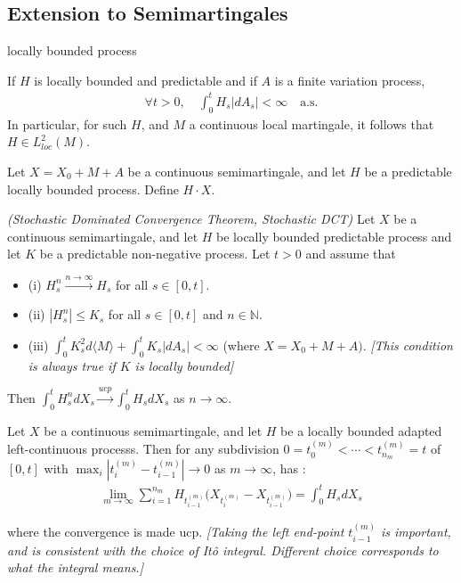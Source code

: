\documentclass[10pt,a4paper]{article}
\renewenvironment{i}
{\begin{itemize} 
	}%
	{\end{itemize}
}
\begin{document}
\subsection{Extension to Semimartingales}

 locally bounded process
\s

\fact If $H$ is locally bounded and predictable and if $A$ is a finite variation process,
\begin{align*}
\forall t>0, \quad \int_0^t H_s |dA_s| < \infty \quad \text{a.s.}
\end{align*}
In particular, for such $H$, and $M$ a continuous local martingale, it follows that $H\in L_{loc}^2(M)$.
\s

 Let $X = X_0 + M + A$ be a continuous semimartingale, and let $H$ be a predictable locally bounded process. Define $H\cdot X$.
\s

\prop \emph{(Stochastic Dominated Convergence Theorem, Stochastic DCT)} Let $X$ be a continuous semimartingale, and let $H$ be locally bounded predictable process and let $K$ be a predictable non-negative process. Let $t>0$ and assume that
\begin{i}
\item[(i)] $H_s^n \xrightarrow{n\rightarrow \infty} H_s$ for all $s\in [0,t]$.
\item[(ii)] $|H_s^n|\leq K_s$ for all $s\in [0, t]$ and $n\in \mathbb{N}$.
\item[(iii)] $\int_0^t K_s^2 d\langle M \rangle + \int_0^t K_s |dA_s| < \infty$ (where $X = X_0 + M +A)$. \emph{[This condition is always true if $K$ is locally bounded]}
\end{i}
Then $\int_0^t H_s^n dX_s \xrightarrow{ucp}\int_0^t H_s dX_s$ as $n\rightarrow \infty$.
\s

\corr Let $X$ be a continuous semimartingale, and let $H$ be a locally bounded adapted left-continuous processs. Then for any subdivision $0 =t_0^{(m)} < \cdots < t_{n_m}^{(m)}=t$ of $[0,t]$ with $\max_i |t_i^{(m)} - t_{i-1}^{(m)}| \rightarrow 0$ as $m\rightarrow \infty$, has :
\begin{align*}
\lim_{m\rightarrow \infty} \sum_{i=1}^{n_m} H_{t_{i-1}^{(m)}} \big(X_{t_i^{(m)}} -X_{t_{i-1}^{(m)}} \big) = \int_0^t H_s dX_s
\end{align*}

where the convergence is made ucp.
\emph{[Taking the left end-point $t_{i-1}^{(m)}$ is important, and is consistent with the choice of It\^o integral. Different choice corresponds to what the integral means.]}
\s
\end{document}
